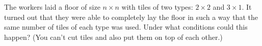 The workers laid a floor of size $n \times n$ with tiles of two types: $2 \times  2$ and $3 \times  1$.
It turned out that they were able to completely lay the floor in such a way that the same number of tiles of each type was used. Under what conditions could this happen?
(You can’t cut tiles and also put them on top of each other.)